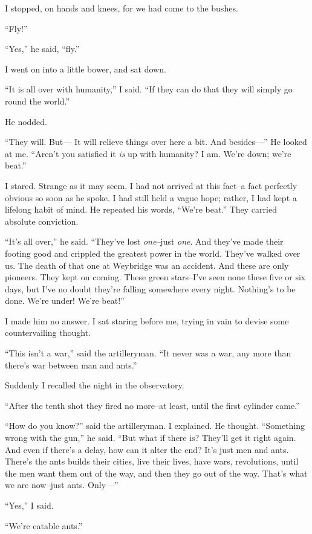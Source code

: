 I stopped, on hands and knees, for we had come to the bushes.

``Fly!''

``Yes,'' he said, ``fly.''

I went on into a little bower, and sat down.

``It is all over with humanity,'' I said. ``If they can do that they
will simply go round the world.''

He nodded.

``They will. But--- It will relieve things over here a bit. And
besides---'' He looked at me. ``Aren't you satisfied it \emph{is} up
with humanity? I am. We're down; we're beat.''

I stared. Strange as it may seem, I had not arrived at this fact--a
fact perfectly obvious so soon as he spoke. I had still held a
vague hope; rather, I had kept a lifelong habit of mind. He
repeated his words, ``We're beat.'' They carried absolute
conviction.

``It's all over,'' he said. ``They've lost \emph{one}--just
\emph{one}. And they've made their footing good and crippled the
greatest power in the world. They've walked over us. The death of
that one at Weybridge was an accident. And these are only pioneers.
They kept on coming. These green stars--I've seen none these five
or six days, but I've no doubt they're falling somewhere every
night. Nothing's to be done. We're under! We're beat!''

I made him no answer. I sat staring before me, trying in vain to
devise some countervailing thought.

``This isn't a war,'' said the artilleryman. ``It never was a war, any
more than there's war between man and ants.''

Suddenly I recalled the night in the observatory.

``After the tenth shot they fired no more--at least, until the first
cylinder came.''

``How do you know?'' said the artilleryman. I explained. He thought.
``Something wrong with the gun,'' he said. ``But what if there is?
They'll get it right again. And even if there's a delay, how can it
alter the end? It's just men and ants. There's the ants builds
their cities, live their lives, have wars, revolutions, until the
men want them out of the way, and then they go out of the way.
That's what we are now--just ants. Only---''

``Yes,'' I said.

``We're eatable ants.''

